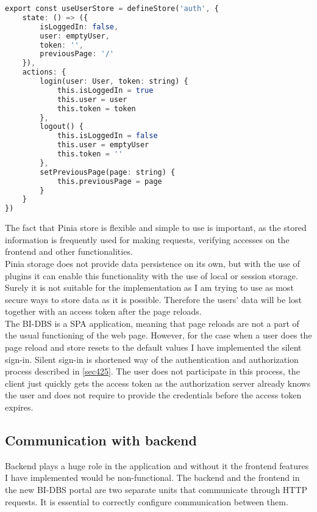 \begin{lstlisting}[language=Octave, caption=Pinia store configuration for user states]
export const useUserStore = defineStore('auth', {
    state: () => ({
        isLoggedIn: false,
        user: emptyUser,
        token: '',
        previousPage: '/'
    }),
    actions: {
        login(user: User, token: string) {
            this.isLoggedIn = true
            this.user = user
            this.token = token
        },
        logout() {
            this.isLoggedIn = false
            this.user = emptyUser
            this.token = ''
        },
        setPreviousPage(page: string) {
            this.previousPage = page
        }
    }
})
\end{lstlisting}


\noindent The fact that Pinia store is flexible and simple to use is important, as the stored information is frequently used for making requests, verifying accesses on the frontend and other functionalities.\\
Pinia storage does not provide data persistence on its own, but with the use of plugins it can enable this functionality with the use of local or session storage. Surely it is not suitable for the implementation as I am trying to use as most secure ways to store data as it is possible. Therefore the users' data will be lost together with an access token after the page reloads.\\
The BI-DBS is a SPA application, meaning that page reloads are not a part of the usual functioning of the web page. However, for the case when a user does the page reload and store resets to the default values I have implemented the silent sign-in. Silent sign-in is shortened way of the authentication and authorization process described in \ref{sec425}. The user does not participate in this process, the client just quickly gets the access token as the authorization server already knows the user and does not require to provide the credentials before the access token expires.





\subsection{Communication with backend} Backend plays a huge role in the application and without it the frontend features I have implemented  would be non-functional. The backend and the frontend in the new BI-DBS portal are two separate units that communicate through HTTP requests. It is essential to correctly configure communication between them.

